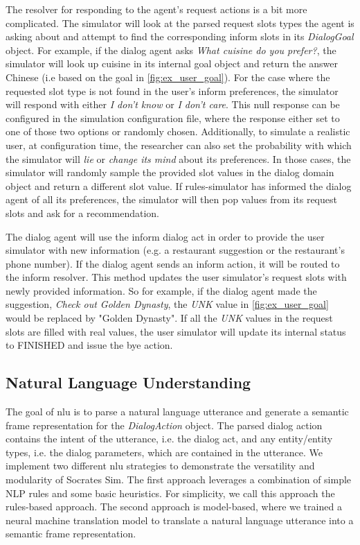 The resolver for responding to the agent's request actions is a bit more complicated. The simulator will look at the parsed request slots types the agent is asking about and attempt to find the corresponding inform slots in its \textit{DialogGoal} object. For example, if the dialog agent asks \textit{What cuisine do you prefer?}, the simulator will look up cuisine in its internal goal object and return the answer Chinese (i.e based on the goal in \ref{fig:ex_user_goal}). For the case where the requested slot type is not found in the user's inform preferences, the simulator will respond with either\textit{ I don't know} or \textit{I don't care}. This null response can be configured in the simulation configuration file, where the response either set to one of those two options or randomly chosen. Additionally, to simulate a realistic user, at configuration time, the researcher can also set the probability with which the simulator will \textit{lie} or \textit{change its mind } about its preferences. In those cases, the simulator will randomly sample the provided slot values in the dialog domain object and return a different slot value. If rules-simulator has informed the dialog agent of all its preferences, the simulator will then pop values from its request slots and ask for a recommendation. 

The dialog agent will use the inform dialog act in order to provide the user simulator with new information (e.g. a restaurant suggestion or the restaurant's phone number). If the dialog agent sends an inform action, it will be routed to the inform resolver. This method updates the user simulator's request slots with newly provided information. So for example, if the dialog agent made the suggestion, \textit{Check out Golden Dynasty}, the \textit{UNK} value in \ref{fig:ex_user_goal} would be replaced by "Golden Dynasty". If all the \textit{UNK} values in the request slots are filled with real values, the user simulator will update its internal status to FINISHED and issue the bye action. 

\subsection{Natural Language Understanding}
The goal of nlu is to parse a natural language utterance and generate a semantic frame representation for the \textit{DialogAction} object. The parsed dialog action contains the intent of the utterance, i.e. the dialog act, and any entity/entity types, i.e. the dialog parameters, which are contained in the utterance. We implement two different nlu strategies to demonstrate the versatility and modularity of Socrates Sim. The first approach leverages a combination of simple NLP rules and some basic heuristics. For simplicity, we call this approach the rules-based approach. The second approach is model-based, where we trained a neural machine translation model to translate a natural language utterance into a semantic frame representation. 

